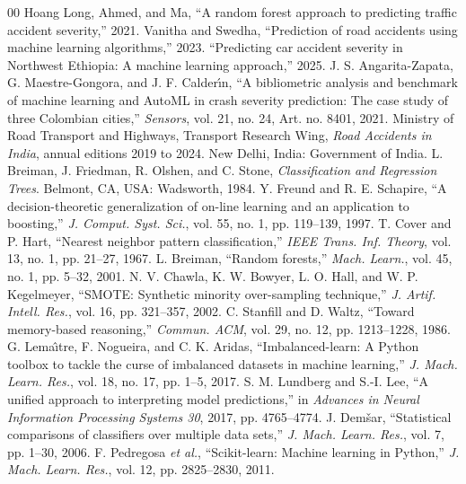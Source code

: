 \documentclass[conference]{IEEEtran}
\begin{document}
\begin{thebibliography}{00}
 Hoang Long, Ahmed, and Ma, ``A random forest approach to predicting traffic accident severity,'' 2021.
 Vanitha and Swedha, ``Prediction of road accidents using machine learning algorithms,'' 2023.
 ``Predicting car accident severity in Northwest Ethiopia: A machine learning approach,'' 2025.
 J. S. Angarita-Zapata, G. Maestre-Gongora, and J. F. Calder\'{\i}n, ``A bibliometric analysis and benchmark of machine learning and AutoML in crash severity prediction: The case study of three Colombian cities,'' \emph{Sensors}, vol. 21, no. 24, Art. no. 8401, 2021.
 Ministry of Road Transport and Highways, Transport Research Wing, \emph{Road Accidents in India}, annual editions 2019 to 2024. New Delhi, India: Government of India.
 L. Breiman, J. Friedman, R. Olshen, and C. Stone, \emph{Classification and Regression Trees}. Belmont, CA, USA: Wadsworth, 1984.
 Y. Freund and R. E. Schapire, ``A decision-theoretic generalization of on-line learning and an application to boosting,'' \emph{J. Comput. Syst. Sci.}, vol. 55, no. 1, pp. 119--139, 1997.
 T. Cover and P. Hart, ``Nearest neighbor pattern classification,'' \emph{IEEE Trans. Inf. Theory}, vol. 13, no. 1, pp. 21--27, 1967.
 L. Breiman, ``Random forests,'' \emph{Mach. Learn.}, vol. 45, no. 1, pp. 5--32, 2001.
 N. V. Chawla, K. W. Bowyer, L. O. Hall, and W. P. Kegelmeyer, ``SMOTE: Synthetic minority over-sampling technique,'' \emph{J. Artif. Intell. Res.}, vol. 16, pp. 321--357, 2002.
 C. Stanfill and D. Waltz, ``Toward memory-based reasoning,'' \emph{Commun. ACM}, vol. 29, no. 12, pp. 1213--1228, 1986.
 G. Lema\^{\i}tre, F. Nogueira, and C. K. Aridas, ``Imbalanced-learn: A Python toolbox to tackle the curse of imbalanced datasets in machine learning,'' \emph{J. Mach. Learn. Res.}, vol. 18, no. 17, pp. 1--5, 2017.
 S. M. Lundberg and S.-I. Lee, ``A unified approach to interpreting model predictions,'' in \emph{Advances in Neural Information Processing Systems 30}, 2017, pp. 4765--4774.
 J. Dem\v{s}ar, ``Statistical comparisons of classifiers over multiple data sets,'' \emph{J. Mach. Learn. Res.}, vol. 7, pp. 1--30, 2006.
 F. Pedregosa \emph{et al.}, ``Scikit-learn: Machine learning in Python,'' \emph{J. Mach. Learn. Res.}, vol. 12, pp. 2825--2830, 2011.
\end{thebibliography}
\end{document}
